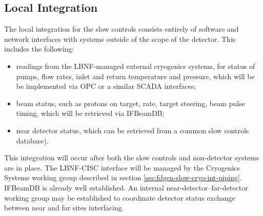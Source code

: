 \subsection{Local Integration}
\label{sec:fdgen-slow-cryo-slow-loc-integ}


The local integration for the slow controls consists entirely of software
and network interfaces with systems outside of the scope of the detector.
This includes the following:
\begin{itemize}
\item readings from the LBNF-managed external cryogenics systems, for status of pumps, flow rates, inlet and return temperature and pressure, which will be be implemented via OPC or a similar SCADA interfaces;
\item beam status, such as protons on target, rate, target steering, beam pulse timing, which will be retrieved via IFBeamDB;
\item near detector status, which can be retrieved from a common slow controls database).
\end{itemize}

This integration will occur after both the slow controls and non-detector
systems are in place.  The LBNF-CISC interface will be managed by the
Cryogenics Systems working group described in section
\ref{sec:fdgen-slow-cryo-int-piping}.  IFBeamDB is already well established.
An internal near-detector--far-detector working group may be established
to coordinate detector status exchange between near and far sites interfacing.



%
%  
%  

%
%  

